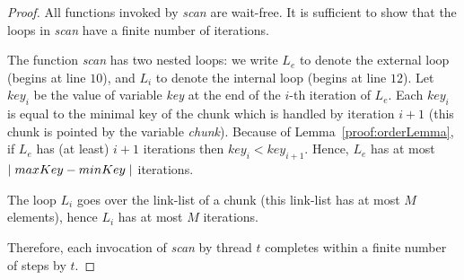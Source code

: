 \begin{proof}
All functions invoked by \emph{scan} are wait-free.
It is sufficient to show that the loops in  \emph{scan} have
a finite number of iterations.

The function \emph{scan} has two nested loops:
we write $L_e$ to denote the external loop (begins at line $10$), and $L_i$ to denote the internal loop (begins at line $12$).
Let ${key}_i$ be the value of variable \emph{key} at the end of the $i$-th iteration of $L_e$.
Each ${key}_i$ is equal to the minimal key of the chunk which is handled by iteration $i+1$
(this chunk is pointed by the variable \emph{chunk}).
Because of Lemma~\ref{proof:orderLemma}, if $L_e$ has (at least) $i+1$ iterations then ${key}_i < {key}_{i+1}$.
Hence, $L_e$ has at most  $\mid{maxKey - minKey}\mid$ iterations.

The loop $L_i$ goes over the link-list of a chunk (this link-list has at most $M$ elements), hence $L_i$ has at most $M$ iterations.

Therefore, each invocation of \emph{scan} by thread $t$ completes within a finite number of steps by $t$.

\end{proof}





